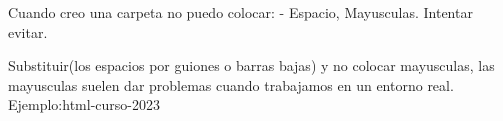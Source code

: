 Cuando creo una carpeta no puedo colocar:
- Espacio, Mayusculas. Intentar evitar.


Substituir(los espacios por guiones o barras bajas) y no colocar mayusculas, las mayusculas suelen dar problemas cuando trabajamos en un entorno real.
Ejemplo:html-curso-2023